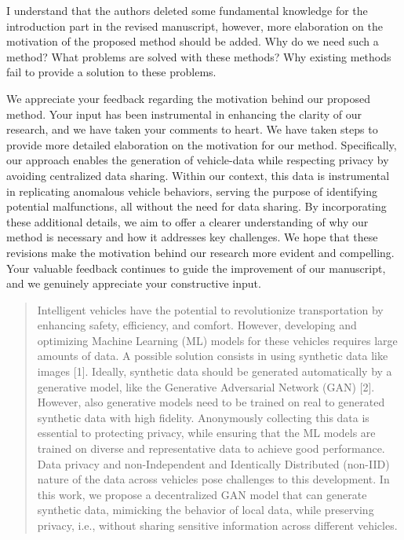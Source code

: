 \documentclass{article}
\begin{document}
\RC I understand that the authors deleted some fundamental knowledge for the introduction part in the revised manuscript, however, more elaboration on the motivation of the proposed method should be added. Why do we need such a method? What problems are solved with these methods? Why existing methods fail to provide a solution to these problems.

\AR We appreciate your feedback regarding the motivation behind our proposed method. Your input has been instrumental in enhancing the clarity of our research, and we have taken your comments to heart.
We have taken steps to provide more detailed elaboration on the motivation for our method. Specifically, our approach enables the generation of vehicle-data while respecting privacy by avoiding centralized data sharing. Within our context, this data is instrumental in replicating anomalous vehicle behaviors, serving the purpose of identifying potential malfunctions, all without the need for data sharing.
By incorporating these additional details, we aim to offer a clearer understanding of why our method is necessary and how it addresses key challenges. We hope that these revisions make the motivation behind our research more evident and compelling.
Your valuable feedback continues to guide the improvement of our manuscript, and we genuinely appreciate your constructive input.

\begin{quote}
Intelligent vehicles have the potential to revolutionize transportation by enhancing safety, efficiency, and comfort. However, developing and optimizing Machine Learning (ML) models for these vehicles requires large amounts of data. A possible solution consists in using synthetic data like images [1]. Ideally, synthetic data should be generated automatically by a generative model, like the Generative Adversarial Network (GAN) [2]. However, also generative models need to be trained on real to generated synthetic data with high fidelity.
Anonymously collecting this data is essential to protecting privacy, while ensuring that the ML models are trained on diverse and representative data to achieve good performance.
Data privacy and non-Independent and Identically Distributed (non-IID) nature of the data across vehicles pose challenges to this development. In this work, we propose a decentralized GAN model that can generate synthetic data, mimicking the behavior of local data, while preserving privacy, i.e., without sharing sensitive information
across different vehicles.
\end{quote}
\end{document}
